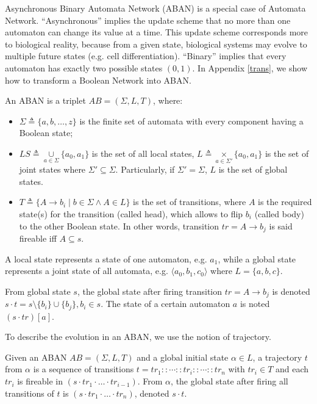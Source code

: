 \documentclass{entcs}
\begin{document}
Asynchronous Binary Automata Network (ABAN) is a special case of Automata Network.  
``Asynchronous'' implies the update scheme that no more than one automaton can change its value at a time.
This update scheme corresponds more to biological reality, because from a given state, biological systems may evolve to multiple future states (e.g. cell differentiation). 
``Binary'' implies that every automaton has exactly two possible states $(0,1)$.  In Appendix \ref{trans}, we show how to transform a Boolean Network into ABAN.

\begin{definition}[ABAN]
An ABAN is a triplet $AB = (\Sigma,L,T)$, where:
\begin{itemize}
\item $\Sigma\triangleq\{a,b,\ldots,z\}$ is the finite set of automata with every component having a Boolean state;
\item $LS\triangleq \underset{a\in \Sigma}{\cup} \{a_0,a_1\}$ is the set of all local states, $L\triangleq \underset{a\in \Sigma'}{\times} \{a_0,a_1\}$ is the set of joint states where $\Sigma'\subseteq\Sigma$. Particularly, if $\Sigma'=\Sigma$, $L$ is the set of global states. 
\item $T\triangleq \{A\rightarrow b_i\mid b\in \Sigma \land A\in L\}$ is the set of transitions, where $A$ is the required state(s) for the transition (called head), which allows to flip $b_i$ (called body) to the other Boolean state. In other words, transition $tr=A\to b_j$ is said fireable iff $A\subseteq s$.%
\end{itemize}
\end{definition}

A local state represents a state of one automaton, e.g. $a_1$, while a global state represents a joint state of all automata, e.g. $\langle a_0, b_1,c_0 \rangle$ where $L=\{a,b,c\}$.

\begin{definition}[Dynamics]
    From global state $s$, the global state after firing transition $tr=A\to b_j$ is denoted $s \cdot t = s \setminus \{b_i\} \cup \{b_j\}, b_i \in s$.
    The state of a certain automaton $a$ is noted $(s\cdot tr)[a]$.
\end{definition}

To describe the evolution in an ABAN, we use the notion of trajectory.
\begin{definition}[Trajectory]
Given an ABAN $AB = (\Sigma,L,T)$ and a global initial state $\alpha\in L$, a trajectory $t$ from $\alpha$ is a sequence of transitions $t=tr_1::\cdots :: tr_i::\cdots ::tr_n$ with $tr_i\in T$ and each $tr_i$ is fireable in $(s \cdot tr_1 \cdot \ldots \cdot tr_{i-1})$.
From $\alpha$, the global state after firing all transitions of $t$ is $(s \cdot tr_1 \cdot \ldots \cdot tr_n)$, denoted $s \cdot t$.
\end{definition}
\end{document}
